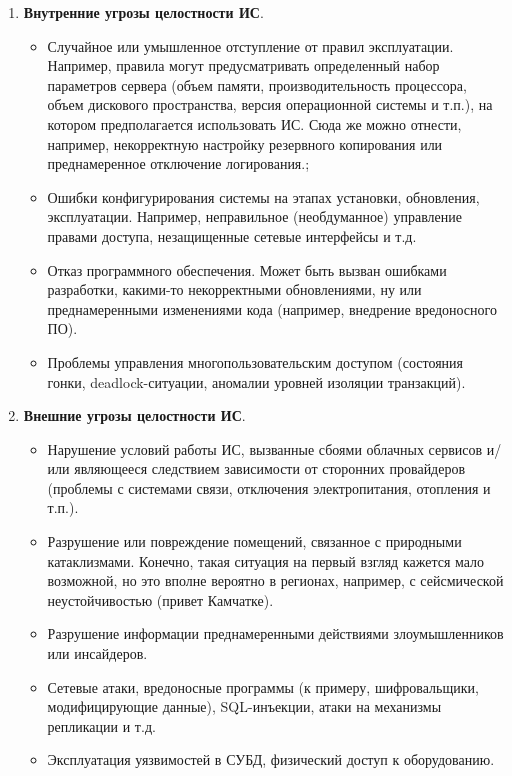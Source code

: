 \begin{enumerate}
\item \textbf{Внутренние угрозы целостности ИС}.
    \begin{itemize}
        \item Случайное или умышленное отступление от правил эксплуатации. Например, правила могут предусматривать определенный набор параметров сервера (объем памяти, производительность процессора, объем дискового пространства, версия операционной системы и т.п.), на котором предполагается использовать ИС. Сюда же можно отнести, например, некорректную настройку резервного копирования или преднамеренное отключение логирования.;
        \item Ошибки конфигурирования системы на этапах установки, обновления, эксплуатации. Например, неправильное (необдуманное) управление правами доступа, незащищенные сетевые интерфейсы и т.д.
        \item Отказ программного обеспечения. Может быть вызван ошибками разработки, какими-то некорректными обновлениями, ну или преднамеренными изменениями кода (например, внедрение вредоносного ПО).
	    \item Проблемы управления многопользовательским доступом (состояния гонки, deadlock-ситуации, аномалии уровней изоляции транзакций).
    \end{itemize}

\item \textbf{Внешние угрозы целостности ИС}.
    \begin{itemize}
        \item Нарушение условий работы ИС, вызванные сбоями облачных сервисов и/или являющееся следствием зависимости от сторонних провайдеров (проблемы с системами связи, отключения электропитания, отопления и т.п.).
        \item Разрушение или повреждение помещений, связанное с природными катаклизмами. Конечно, такая ситуация на первый взгляд кажется мало возможной, но это вполне вероятно в регионах, например, с сейсмической неустойчивостью (привет Камчатке).
        \item Разрушение информации преднамеренными действиями злоумышленников или инсайдеров.
        \item Сетевые атаки, вредоносные программы (к примеру, шифровальщики, модифицирующие данные), SQL-инъекции, атаки на механизмы репликации и т.д.
	\item Эксплуатация уязвимостей в СУБД, физический доступ к оборудованию.
    \end{itemize}
\end{enumerate}

